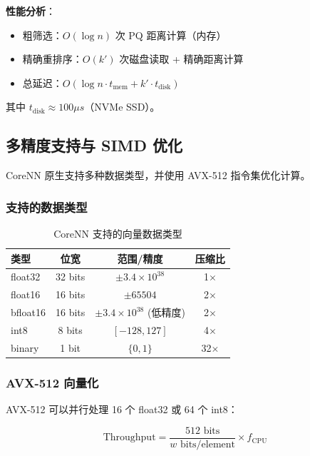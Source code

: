 \textbf{性能分析}：
\begin{itemize}
    \item 粗筛选：$O(\log n)$ 次 PQ 距离计算（内存）
    \item 精确重排序：$O(k')$ 次磁盘读取 + 精确距离计算
    \item 总延迟：$O(\log n \cdot t_{\text{mem}} + k' \cdot t_{\text{disk}})$
\end{itemize}

其中 $t_{\text{disk}} \approx 100 \mu s$（NVMe SSD）。

\subsection{多精度支持与 SIMD 优化}

CoreNN 原生支持多种数据类型，并使用 AVX-512 指令集优化计算。

\subsubsection{支持的数据类型}

\begin{table}[h]
\centering
\begin{tabular}{@{}lccc@{}}
\toprule
\textbf{类型} & \textbf{位宽} & \textbf{范围/精度} & \textbf{压缩比} \\
\midrule
float32 & 32 bits & $\pm 3.4 \times 10^{38}$ & 1$\times$ \\
float16 & 16 bits & $\pm 65504$ & 2$\times$ \\
bfloat16 & 16 bits & $\pm 3.4 \times 10^{38}$ (低精度) & 2$\times$ \\
int8 & 8 bits & $[-128, 127]$ & 4$\times$ \\
binary & 1 bit & $\{0, 1\}$ & 32$\times$ \\
\bottomrule
\end{tabular}
\caption{CoreNN 支持的向量数据类型}
\end{table}

\subsubsection{AVX-512 向量化}

AVX-512 可以并行处理 16 个 float32 或 64 个 int8：

\begin{equation}
\text{Throughput} = \frac{512 \text{ bits}}{w \text{ bits/element}} \times f_{\text{CPU}}
\end{equation}

